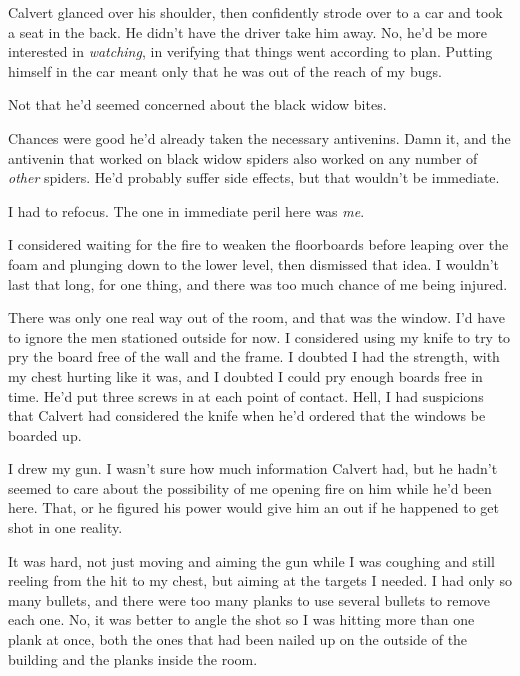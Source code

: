 Calvert glanced over his shoulder, then confidently strode over to a car and took a seat in the back.  He didn't have the driver take him away.  No, he'd be more interested in \emph{watching}, in verifying that things went according to plan.  Putting himself in the car meant only that he was out of the reach of my bugs.



Not that he'd seemed concerned about the black widow bites.



Chances were good he'd already taken the necessary antivenins.  Damn it, and the antivenin that worked on black widow spiders also worked on any number of \emph{other} spiders.  He'd probably suffer side effects, but that wouldn't be immediate.



I had to refocus.  The one in immediate peril here was \emph{me}.



I considered waiting for the fire to weaken the floorboards before leaping over the foam and plunging down to the lower level, then dismissed that idea.  I wouldn't last that long, for one thing, and there was too much chance of me being injured.



There was only one real way out of the room, and that was the window.  I'd have to ignore the men stationed outside for now.  I considered using my knife to try to pry the board free of the wall and the frame.  I doubted I had the strength, with my chest hurting like it was, and I doubted I could pry enough boards free in time.  He'd put three screws in at each point of contact.  Hell, I had suspicions that Calvert had considered the knife when he'd ordered that the windows be boarded up.



I drew my gun.  I wasn't sure how much information Calvert had, but he hadn't seemed to care about the possibility of me opening fire on him while he'd been here.  That, or he figured his power would give him an out if he happened to get shot in one reality.



It was hard, not just moving and aiming the gun while I was coughing and still reeling from the hit to my chest, but aiming at the targets I needed.  I had only so many bullets, and there were too many planks to use several bullets to remove each one.  No, it was better to angle the shot so I was hitting more than one plank at once, both the ones that had been nailed up on the outside of the building and the planks inside the room.



